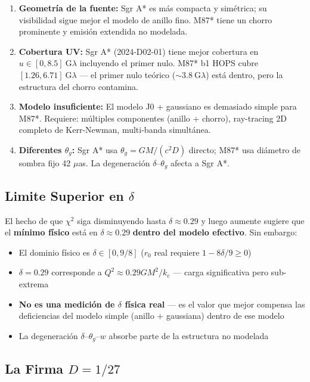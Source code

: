 \documentclass[12pt,a4paper]{article}
\begin{document}
\begin{enumerate}
    \item \textbf{Geometría de la fuente:} Sgr A* es más compacta y simétrica; su visibilidad sigue mejor el modelo de anillo fino. M87* tiene un chorro prominente y emisión extendida no modelada.
    \item \textbf{Cobertura UV:} Sgr A* (2024-D02-01) tiene mejor cobertura en $u \in [0, 8.5] \ \text{G}\lambda$ incluyendo el primer nulo. M87* b1 HOPS cubre $[1.26, 6.71] \ \text{G}\lambda$ — el primer nulo teórico ($\sim 3.8 \ \text{G}\lambda$) está dentro, pero la estructura del chorro contamina.
    \item \textbf{Modelo insuficiente:} El modelo J0 + gaussiano es demasiado simple para M87*. Requiere: múltiples componentes (anillo + chorro), ray-tracing 2D completo de Kerr-Newman, multi-banda simultánea.
    \item \textbf{Diferentes $\theta_g$:} Sgr A* usa $\theta_g = GM/(c^2D)$ directo; M87* usa diámetro de sombra fijo 42 $\mu$as. La degeneración $\delta$--$\theta_g$ afecta a Sgr A*.
\end{enumerate}

\subsection{Limite Superior en $\delta$}

El hecho de que $\chi^2$ siga disminuyendo hasta $\delta \approx 0.29$ y luego aumente sugiere que el \textbf{mínimo físico} está en $\delta \approx 0.29$ \textbf{dentro del modelo efectivo}. Sin embargo:

\begin{itemize}
    \item El dominio físico es $\delta \in [0, 9/8]$ ($r_0$ real requiere $1 - 8\delta/9 \geq 0$)
    \item $\delta = 0.29$ corresponde a $Q^2 \approx 0.29 GM^2/k_e$ — carga significativa pero sub-extrema
    \item \textbf{No es una medición de $\delta$ física real} — es el valor que mejor compensa las deficiencias del modelo simple (anillo + gaussiana) dentro de ese modelo
    \item La degeneración $\delta$--$\theta_g$--$w$ absorbe parte de la estructura no modelada
\end{itemize}

\subsection{La Firma $D = 1/27$}
\end{document}

